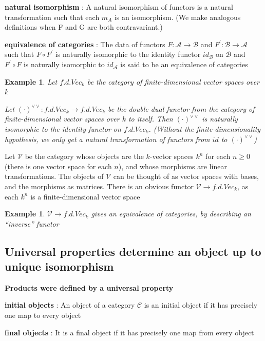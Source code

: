 \documentclass{article}
\newtheorem{example}[theorem]{Example}
\begin{document}
\textbf{natural isomorphism} : A natural isomorphism of functors is a natural transformation such that each $m_A$ is an isomorphism. (We make analogous definitions when F and G are both contravariant.)

\textbf{equivalence of categories} : The data of functors $F: \mathscr A \rightarrow \mathscr B$ and $F^\prime: \mathscr B \rightarrow \mathscr A$ such that $F \circ F^\prime$ is naturally isomorphic to the identity functor $id_\mathscr B$ on $\mathscr B$ and $F^\prime \circ F$ is naturally isomorphic to $id_\mathscr A$ is said to be an equivalence of categories
\begin{example}
    Let $f.d.Vec_k$ be the category of finite-dimensional vector spaces over $k$
    
    Let $(\cdot)^{\vee\vee} : f.d.Vec_k \rightarrow f.d.Vec_k$ be the double dual functor from the category of finite-dimensional vector spaces over $k$ to itself. Then $(\cdot)^{\vee\vee}$ is naturally isomorphic to the identity functor on $f.d.Vec_k$. (Without the finite-dimensionality hypothesis, we only get a natural transformation of functors from $id$ to $(\cdot)^{\vee\vee}$)
\end{example}
Let $\mathscr V$ be the category whose objects are the $k$-vector spaces $k^n$ for each $n \geq 0$ (there is one vector space for each $n$), and whose morphisms are linear transformations. The objects of $\mathscr V$ can be thought of as vector spaces with bases, and the morphisms as matrices. There is an obvious functor $\mathscr V \rightarrow f.d.Vec_k$, as each $k^n$ is a
finite-dimensional vector space
\begin{example}
    $\mathscr V \rightarrow f.d.Vec_k$ gives an equivalence of categories, by describing an “inverse” functor
\end{example}





\newpage
\subsection{Universal properties determine an object up to unique isomorphism}

\textbf{Products were defined by a universal property}

\textbf{initial objects} : An object of a category $\mathscr C$ is an initial object if it has precisely one map to every object 

\textbf{final objects} : It is a final object if it has precisely one map from every object
\end{document}
